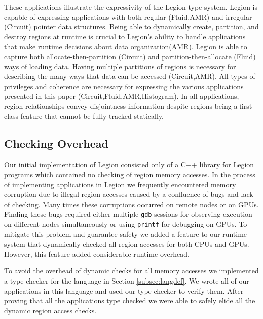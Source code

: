 These applications illustrate the expressivity of the Legion type system.  Legion is capable of 
expressing applications with both regular (Fluid,AMR) and irregular (Circuit) pointer data structures.
Being able to dynamically create, partition, and destroy regions at runtime is crucial to Legion's
ability to handle applications that make runtime decisions about data organization(AMR).  Legion
is able to capture both allocate-then-partition (Circuit) and partition-then-allocate (Fluid) ways 
of loading data.  Having multiple partitions of regions is necessary for describing the many ways 
that data can be accessed (Circuit,AMR).  All types of privileges and coherence are necessary for 
expressing the various applications presented in this paper (Circuit,Fluid,AMR,Histogram).  In
all applications, region relationships convey disjointness information despite
regions being a first-class feature that cannot be fully tracked statically.

\subsection{Checking Overhead}
\label{subsec:overhead}
Our initial implementation of Legion consisted only of a C++ library for Legion 
programs\cite{Legion12} which contained no checking of region memory accesses.  In the process
of implementing applications in Legion we frequently encountered memory corruption due to
illegal region accesses caused by a confluence of bugs and lack of checking.  Many times these corruptions 
occurred on remote nodes or on GPUs.  Finding these bugs required either multiple {\tt gdb} sessions 
for observing execution on different nodes simultaneously or using {\tt printf} for debugging on
GPUs.  To mitigate this problem and guarantee safety we added a feature to our runtime system that 
dynamically checked all region accesses for both CPUs and GPUs.  However, this feature
added considerable runtime overhead.  

To avoid the overhead of dynamic checks for all memory accesses we implemented a type checker for the
language in Section \ref{subsec:langdef}.  We wrote all of our applications in this language and
used our type checker to verify them.  After proving that all the applications type checked we were
able to safely elide all the dynamic region access checks.


